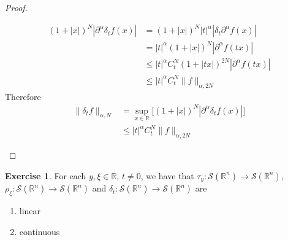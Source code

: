 \documentclass[12pt]{amsart}
\theoremstyle{definition}
\newtheorem{ex}[definition]{Exercise}
\newcommand{\p}{\partial}
\newcommand{\al}{\alpha}
\newcommand{\del}{\delta}
\newcommand{\R}{\mathbb{R}}
\newcommand{\MS}{\mathcal{S}}
\begin{document}
\begin{proof}
\begin{enumerate}
			\begin{align*}
				(1 + |x|)^N |\p^{\al} \del_t f(x)| 
				& = (1 + |x|)^N |t|^{\al}|\del_t \p^{\al} f(x)| \\
				& = |t|^{\al} (1 + |x|)^N |\p^{\al} f(tx)| \\
				& \leq |t|^{\al} C_t^N(1 + |tx|)^{2N} | \p^{\al} f(tx)| \\
				& \leq |t|^{\al} C_t^N\|f\|_{\al, 2N}
			\end{align*}
			Therefore 
			\begin{align*}
				\|\del_tf\|_{\al, N} 
				& = \sup_{x \in \R} \bigg[(1 + |x|)^N |\p^{\al} \del_t f(x)|  \bigg] \\
				& \leq |t|^{\al} C_t^N\|f\|_{\al, 2N}
			\end{align*}
		\end{enumerate}
	\end{proof}

	\begin{ex} For each $y, \xi \in \R$, $t \neq 0$, we have that $\tau_y: \MS(\R^n) \rightarrow \MS(\R^n)$, $\rho_{\xi}: \MS(\R^n) \rightarrow \MS(\R^n)$ and $\del_t: \MS(\R^n) \rightarrow \MS(\R^n)$ are 
		\begin{enumerate}
			\item linear
			\item continuous
		\end{enumerate}
	\end{ex}
\end{document}
